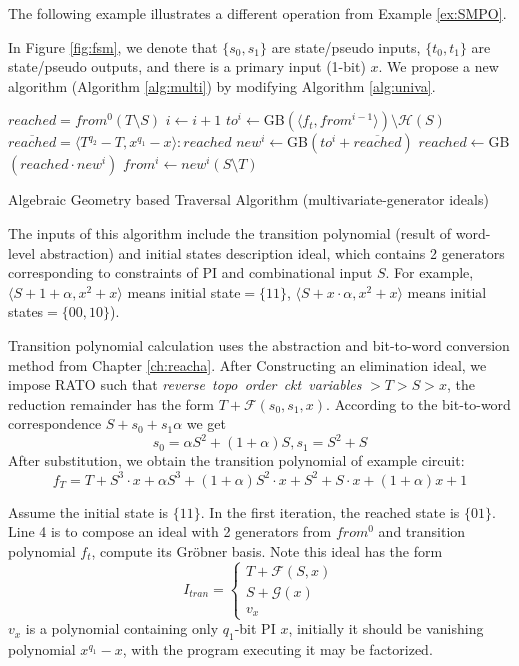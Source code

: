 The following example illustrates a different operation from Example \ref{ex:SMPO}.
\begin{Example}
In Figure \ref{fig:fsm}, we denote that
$\{s_0, s_1\}$ are state/pseudo inputs, $\{t_0,t_1\}$ are state/pseudo outputs, and there is a primary input (1-bit) 
$x$. We propose a new algorithm (Algorithm \ref{alg:multi}) by modifying Algorithm \ref{alg:univa}.

\begin{algorithm}[hbt]
\SetAlgoNoLine
\LinesNumbered
  $reached = from^0(T\setminus S)$\;
  {
  	$i \gets i + 1$\;
	$to^i \gets$GB$(\langle f_t, from^{i-1}\rangle) \setminus \mathcal H(S)$\;
	$\overline{reached} = \langle T^{q_2}-T, x^{q_1} - x \rangle : reached$\;
	$new^i \gets $GB$(to^i + \overline{reached})$\;
  	$reached \gets $GB$( reached \cdot new^i)$\;
	$from^i \gets new^i(S\setminus T)$\;
  }
\caption {Algebraic Geometry based Traversal Algorithm (multivariate-generator ideals)}\label{alg:multi}
\end{algorithm}

The inputs of this algorithm include the transition polynomial (result of word-level abstraction) and initial 
states description ideal, which contains 2 generators corresponding to constraints of PI and combinational input $S$. 
For example, $\langle S+1+\alpha, x^2+x\rangle$ means initial state$=\{11\}$,
$\langle S+x\cdot\alpha, x^2+x\rangle$ means initial states$=\{00,10\}$).

Transition polynomial calculation uses the abstraction and bit-to-word conversion method from 
Chapter \ref{ch:reacha}. After Constructing
an elimination ideal, we impose RATO such that \textit{reverse\ topo\ order\ ckt\ variables }$> T > S > x$, the reduction
remainder has the form $T+\mathcal F(s_0,s_1,x)$. According to the bit-to-word correspondence $S+s_0+s_1\alpha$ we get
$$s_0 = \alpha S^2+ (1+\alpha)S, s_1 = S^2+S$$
After substitution, we obtain the transition polynomial of example circuit: 
$$f_T = T+S^3\cdot x+\alpha S^3+(1+\alpha)S^2\cdot x+S^2+S\cdot x+(1+\alpha)x+1$$

Assume the initial state is $\{11\}$. In the first iteration, the reached state is $\{01\}$. Line 4 is to compose an
ideal with 2 generators from $from^0$ and transition polynomial $f_t$, compute its Gr\"obner basis. Note this ideal
has the form
\begin{equation}
I_{tran} = \left\{
             \begin{array}{c}
             T+\mathcal F(S,x) \\
             S + \mathcal G(x) \\
             v_x
             \end{array}  
        \right.
\end {equation}
$v_x$ is a polynomial containing only $q_1$-bit PI $x$, initially it should be vanishing polynomial $x^{q_1}-x$, 
with the program executing it may be factorized.


\end{Example}
